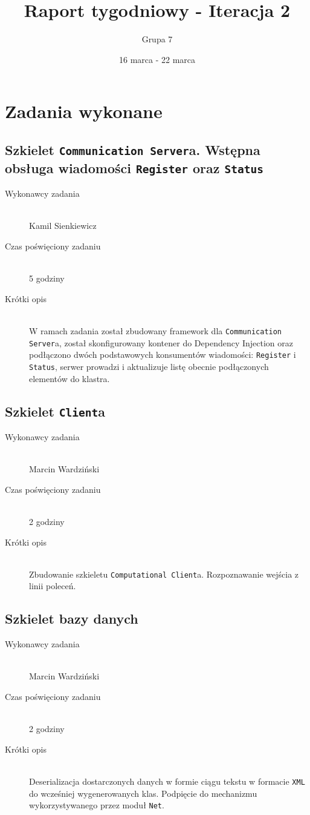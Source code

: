 \documentclass[a4paper]{article}
\title{Raport tygodniowy - Iteracja 2}
\date{16 marca - 22 marca}
\author{Grupa 7}
\begin{document}
\maketitle

\section{Zadania wykonane}
\subsection{Szkielet \texttt{Communication Server}a. Wstępna obsługa wiadomości \texttt{Register} oraz \texttt{Status}}
\begin{description}
    \item[Wykonawcy zadania] \hfill \\ Kamil Sienkiewicz
    \item[Czas poświęciony zadaniu] \hfill \\ 5 godziny
    \item[Krótki opis] \hfill \\ W ramach zadania został zbudowany framework dla \texttt{Communication Server}a, został skonfigurowany kontener do Dependency Injection oraz podłączono dwóch podstawowych konsumentów wiadomości: \texttt{Register} i \texttt{Status}, serwer prowadzi i aktualizuje listę obecnie podłączonych elementów do klastra.
\end{description}

\subsection{Szkielet \texttt{Client}a }
\begin{description}
    \item[Wykonawcy zadania] \hfill \\ Marcin Wardziński
    \item[Czas poświęciony zadaniu] \hfill \\ 2 godziny
    \item[Krótki opis] \hfill \\ Zbudowanie szkieletu \texttt{Computational Client}a. Rozpoznawanie wejścia z linii poleceń.
\end{description}

\subsection{Szkielet bazy danych}
\begin{description}
    \item[Wykonawcy zadania] \hfill \\ Marcin Wardziński
    \item[Czas poświęciony zadaniu] \hfill \\ 2 godziny
    \item[Krótki opis] \hfill \\ Deserializacja dostarczonych danych w formie ciągu tekstu w formacie \texttt{XML} do wcześniej wygenerowanych klas. Podpięcie do mechanizmu wykorzystywanego przez moduł \texttt{Net}.
\end{description}
\end{document}
